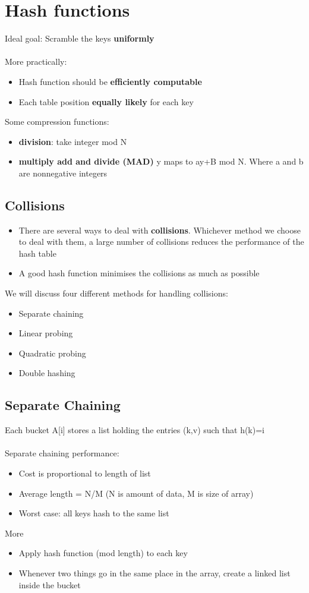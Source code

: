 \documentclass{article}[18pt]
\begin{document}
\section{Hash functions}
Ideal goal: Scramble the keys \textbf{uniformly}\\
\\
More practically:
\begin{itemize}
\item Hash function should be \textbf{efficiently computable}
\item Each table position \textbf{equally likely} for each key
\end{itemize}
Some compression functions:
\begin{itemize}
\item \textbf{division}: take integer mod N
\item \textbf{multiply add and divide (MAD)} y maps to ay+B mod N. Where a and b are nonnegative integers
\end{itemize}
\subsection{Collisions}
\begin{itemize}
\item There are several ways to deal with \textbf{collisions}. Whichever method we choose to deal with them, a large number of collisions reduces the performance of the hash table
\item A good hash function minimises the collisions as much as possible
\end{itemize}
We will discuss four different methods for handling collisions:
\begin{itemize}
\item Separate chaining
\item Linear probing
\item Quadratic probing
\item Double hashing
\end{itemize}
\subsection{Separate Chaining}
Each bucket A[i] stores a list holding the entries (k,v) such that h(k)=i\\
\\
Separate chaining performance:
\begin{itemize}
\item Cost is proportional to length of list
\item Average length = N/M (N is amount of data, M is size of array)
\item Worst case: all keys hash to the same list
\end{itemize}
More
\begin{itemize}
\item Apply hash function (mod length) to each key
\item Whenever two things go in the same place in the array, create a linked list inside the bucket
\end{itemize}
\end{document}
